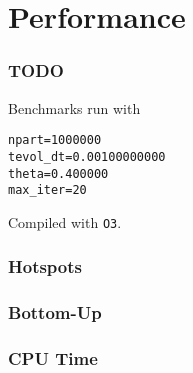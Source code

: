 \section{Performance}

\begin{frame}[fragile]
	\frametitle{TODO}
	Benchmarks run with
\begin{lstlisting}
npart=1000000
tevol_dt=0.00100000000
theta=0.400000
max_iter=20
\end{lstlisting}
	Compiled with \lstinline|O3|.
\end{frame}

\begin{frame}
	\frametitle{Hotspots}
	
\end{frame}

\begin{frame}
\frametitle{Bottom-Up}

\end{frame}

\begin{frame}
\frametitle{CPU Time}

\end{frame}